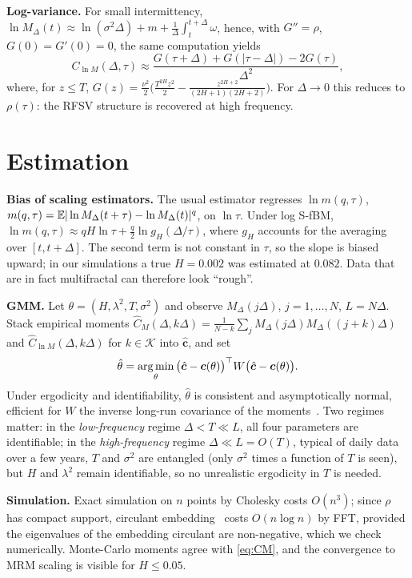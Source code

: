 \documentclass[10pt,twocolumn]{article}
\begin{document}
\textbf{Log-variance.} For small intermittency, $\ln M_\Delta(t)\approx\ln(\sigma^2\Delta)+m+\frac1\Delta\int_t^{t+\Delta}\omega$, hence, with $G''=\rho$, $G(0)=G'(0)=0$, the same computation yields
\begin{equation}
C_{\ln M}(\Delta,\tau)\approx\frac{G(\tau+\Delta)+G(|\tau-\Delta|)-2G(\tau)}{\Delta^2},
\end{equation}
where, for $z\le T$, $G(z)=\frac{\nu^2}{2}\big(\frac{T^{2H}z^2}{2}-\frac{z^{2H+2}}{(2H+1)(2H+2)}\big)$. For $\Delta\to0$ this reduces to $\rho(\tau)$: the RFSV structure is recovered at high frequency.

\section{Estimation}
\textbf{Bias of scaling estimators.} The usual estimator regresses $\ln m(q,\tau)$, $m(q,\tau)=\mathbb{E}|\ln M_\Delta(t+\tau)-\ln M_\Delta(t)|^q$, on $\ln\tau$. Under log S-fBM, $\ln m(q,\tau)\approx qH\ln\tau+\frac q2\ln g_H(\Delta/\tau)$, where $g_H$ accounts for the averaging over $[t,t+\Delta]$. The second term is not constant in $\tau$, so the slope is biased upward; in our simulations a true $H=0.002$ was estimated at $0.082$. Data that are in fact multifractal can therefore look ``rough''.

\textbf{GMM.} Let $\theta=(H,\lambda^2,T,\sigma^2)$ and observe $M_\Delta(j\Delta)$, $j=1,\dots,N$, $L=N\Delta$. Stack empirical moments $\widehat C_M(\Delta,k\Delta)=\frac1{N-k}\sum_jM_\Delta(j\Delta)M_\Delta((j+k)\Delta)$ and $\widehat C_{\ln M}(\Delta,k\Delta)$ for $k\in\mathcal K$ into $\hat{\bm c}$, and set
\begin{equation}
\hat\theta=\operatorname*{arg\,min}_\theta\big(\hat{\bm c}-\bm c(\theta)\big)^\top W\big(\hat{\bm c}-\bm c(\theta)\big).
\end{equation}
Under ergodicity and identifiability, $\hat\theta$ is consistent and asymptotically normal, efficient for $W$ the inverse long-run covariance of the moments~\cite{hansen1982}. Two regimes matter: in the \emph{low-frequency} regime $\Delta<T\ll L$, all four parameters are identifiable; in the \emph{high-frequency} regime $\Delta\ll L=O(T)$, typical of daily data over a few years, $T$ and $\sigma^2$ are entangled (only $\sigma^2$ times a function of $T$ is seen), but $H$ and $\lambda^2$ remain identifiable, so no unrealistic ergodicity in $T$ is needed.

\textbf{Simulation.} Exact simulation on $n$ points by Cholesky costs $O(n^3)$; since $\rho$ has compact support, circulant embedding~\cite{woodchan1994} costs $O(n\log n)$ by FFT, provided the eigenvalues of the embedding circulant are non-negative, which we check numerically. Monte-Carlo moments agree with \eqref{eq:CM}, and the convergence to MRM scaling is visible for $H\le0.05$.
\end{document}
